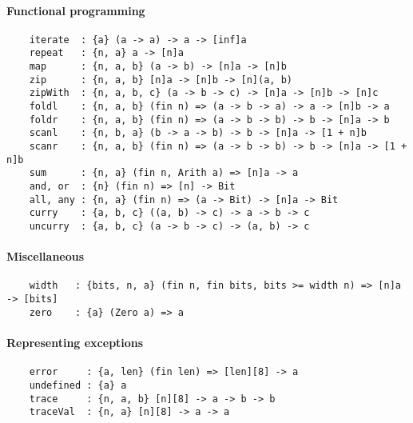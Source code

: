 \paragraph*{Functional programming}
\begin{Verbatim}
    iterate  : {a} (a -> a) -> a -> [inf]a
    repeat   : {n, a} a -> [n]a
    map      : {n, a, b} (a -> b) -> [n]a -> [n]b
    zip      : {n, a, b} [n]a -> [n]b -> [n](a, b)
    zipWith  : {n, a, b, c} (a -> b -> c) -> [n]a -> [n]b -> [n]c
    foldl    : {n, a, b} (fin n) => (a -> b -> a) -> a -> [n]b -> a
    foldr    : {n, a, b} (fin n) => (a -> b -> b) -> b -> [n]a -> b
    scanl    : {n, b, a} (b -> a -> b) -> b -> [n]a -> [1 + n]b
    scanr    : {n, a, b} (fin n) => (a -> b -> b) -> b -> [n]a -> [1 + n]b
    sum      : {n, a} (fin n, Arith a) => [n]a -> a
    and, or  : {n} (fin n) => [n] -> Bit
    all, any : {n, a} (fin n) => (a -> Bit) -> [n]a -> Bit
    curry    : {a, b, c} ((a, b) -> c) -> a -> b -> c
    uncurry  : {a, b, c} (a -> b -> c) -> (a, b) -> c
\end{Verbatim}
\paragraph*{Miscellaneous}
\begin{Verbatim}
    width   : {bits, n, a} (fin n, fin bits, bits >= width n) => [n]a -> [bits]
    zero    : {a} (Zero a) => a
\end{Verbatim}
\paragraph*{Representing exceptions}
\begin{Verbatim}
    error     : {a, len} (fin len) => [len][8] -> a
    undefined : {a} a
    trace     : {n, a, b} [n][8] -> a -> b -> b
    traceVal  : {n, a} [n][8] -> a -> a
\end{Verbatim}


